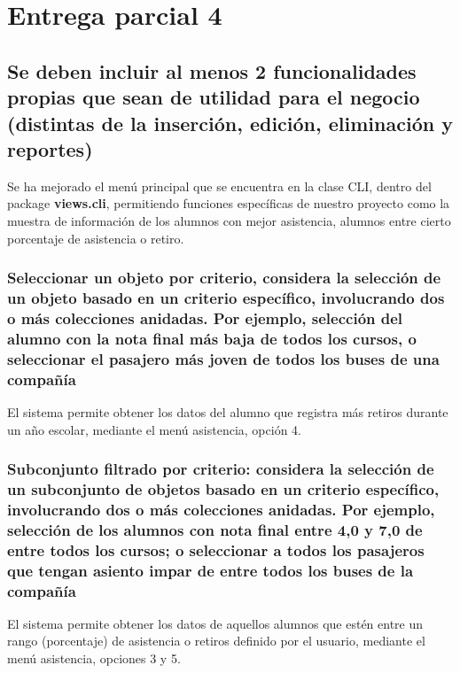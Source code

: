 \renewcommand\thesection{\arabic{section}}
\renewcommand\thesubsection{\thesection.\arabic{subsection}}
\setcounter{section}{3}
\section{Entrega parcial 4}

\subsection{Se deben incluir al menos 2 funcionalidades propias que sean de utilidad para el negocio (distintas de la inserción, edición, eliminación y reportes)}

Se ha mejorado el menú principal que se encuentra en la clase CLI, dentro del package \textbf{views.cli}, permitiendo funciones específicas de nuestro proyecto como la muestra de información de los alumnos con mejor asistencia, alumnos entre cierto porcentaje de asistencia o retiro.


\subsubsection{Seleccionar un objeto por criterio, considera la selección de un objeto basado en un criterio específico, involucrando dos o más colecciones anidadas. Por ejemplo, selección del alumno con la nota final más baja de todos los cursos, o seleccionar el pasajero más joven de todos los buses de una compañía}

El sistema permite obtener los datos del alumno que registra más retiros durante un año escolar, mediante el menú asistencia, opción 4.

\subsubsection{Subconjunto filtrado por criterio: considera la selección de un subconjunto de objetos basado en un criterio específico, involucrando dos o más colecciones anidadas. Por ejemplo, selección de los alumnos con nota final entre 4,0 y 7,0 de entre todos los cursos; o seleccionar a todos los pasajeros que tengan asiento impar de entre todos los buses de la compañía}

El sistema permite obtener los datos de aquellos alumnos que estén entre un rango (porcentaje) de asistencia o retiros definido por el usuario, mediante el menú asistencia, opciones 3 y 5.

